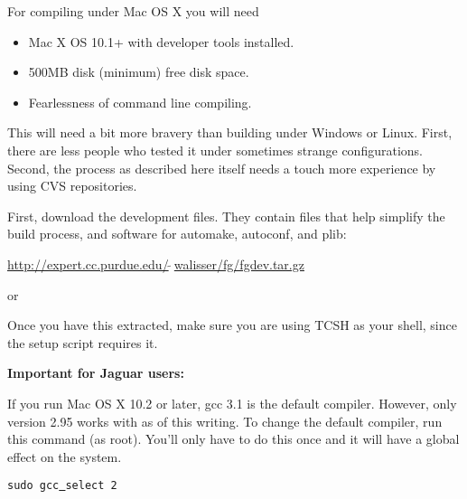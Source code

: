 For compiling under Mac OS X you will need

\begin{itemize}
\item Mac X OS 10.1+ with developer tools installed.
\item 500MB disk (minimum) free disk space.
\item Fearlessness of command line compiling.
\end{itemize}

This will need a bit more bravery than building under Windows or Linux.
First, there are less people who tested it under sometimes strange
configurations. Second, the process as described here itself needs a
touch more experience by using CVS repositories.

First, download the development files. They contain files that help simplify
the build process, and software for automake, autoconf, and plib:
\medskip

     \href{http://expert.cc.purdue.edu/~walisser/fg/fgdev.tar.gz}{http://expert.cc.purdue.edu/$\tilde{~~}$walisser/fg/fgdev.tar.gz}
\medskip

\noindent
or
\medskip

\medskip

\noindent
Once you have this extracted, make sure you are using TCSH as your shell,
since the setup script requires it. 

\noindent
\textbf{Important for Jaguar users:}

If you run Mac OS X 10.2 or later, gcc 3.1 is the default compiler.
However, only version 2.95 works with \FlightGear{} as of this writing.
To change the default compiler, run this command (as root). You'll only
have to do this once and it will have a global effect on the system.
\medskip

\texttt{sudo gcc\underline{~}select 2}

